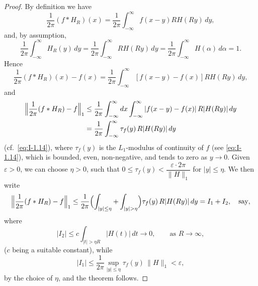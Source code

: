 \begin{proof}
By definition we have
\begin{equation*}
\frac{1}{2\pi}(f*H_R)(x)=\frac{1}{2\pi}\int_{-\infty}^{\infty}f(x-y)RH(Ry)\,dy,
\end{equation*}
and, by assumption,
\begin{equation*}
\frac{1}{2\pi}\int_{-\infty}^{\infty}H_R(y)\,dy
=\frac{1}{2\pi}\int_{-\infty}^{\infty}RH(Ry)\,dy
=\frac{1}{2\pi}\int_{-\infty}^{\infty}H(\alpha)\,d\alpha=1.
\end{equation*}
Hence
\begin{equation*}
\frac{1}{2\pi}(f*H_R)(x)-f(x)
=\frac{1}{2\pi}\int_{-\infty}^{\infty}[f(x-y)-f(x)]RH(Ry)\,dy,
\end{equation*}
and
\begin{equation*}
\begin{aligned}
\Bigl\|\frac{1}{2\pi}(f*H_R)-f\Bigr\|_1 &\le \frac{1}{2\pi}\int_{-\infty}^{\infty}dx\int_{-\infty}^{\infty}|f(x-y)-f(x)|\,R|H(Ry)|\,dy\\
&= \frac{1}{2\pi}\int_{-\infty}^{\infty}\tau_f(y)\,R|H(Ry)|\,dy
\end{aligned}
\end{equation*}
(cf.\ \eqref{eq:I-1.14}), where $\tau_f(y)$ is the $L_1$-modulus of continuity of $f$ (see \eqref{eq:I-1.14}), which is bounded, even, non-negative, and tends to zero as $y\to 0$. Given $\varepsilon>0$, we can choose $\eta>0$, such that $0\le\tau_f(y)<\dfrac{\varepsilon\cdot 2\pi}{\|H\|_1}$ for $|y|\le\eta$. We then write
\begin{equation*}
\Bigl\|\frac{1}{2\pi}(f*H_R)-f\Bigr\|_1
\le\frac{1}{2\pi}\Bigl(\int_{|y|\le\eta}+\int_{|y|>\eta}\Bigr)\tau_f(y)\,R|H(Ry)|\,dy
=I_1+I_2,\quad\text{say},
\end{equation*}
where
\begin{equation*}
|I_2|\le c\int_{|t|>\eta R}|H(t)|\,dt\to 0,\qquad\text{as }R\to\infty,
\end{equation*}
($c$ being a suitable constant), while
\begin{equation*}
|I_1|\le\frac{1}{2\pi}\sup_{|y|\le\eta}\tau_f(y)\,\|H\|_1<\varepsilon,
\end{equation*}
by the choice of $\eta$, and the theorem follows.
\end{proof}

